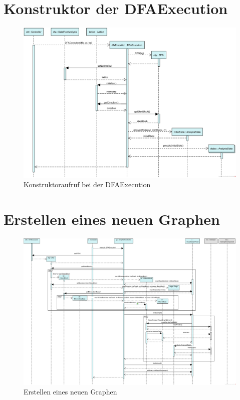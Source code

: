 \section*{Konstruktor der DFAExecution}
\begin{figure}[H]
	\centering
	\includegraphics[width=1\textwidth]{Sequenzdiagramme/KonstruktorDFAExecution}
	\caption{Konstruktoraufruf bei der DFAExecution}
	\label{fig:dfactor}
\end{figure}
\FloatBarrier
\clearpage


\section*{Erstellen eines neuen Graphen}
\begin{figure}[H]
  \centering
    \includegraphics[width=1\textwidth]{Sequenzdiagramme/CreateGraph}
  \caption{Erstellen eines neuen Graphen}
  \label{fig:creategraph}
\end{figure}
\newpage

